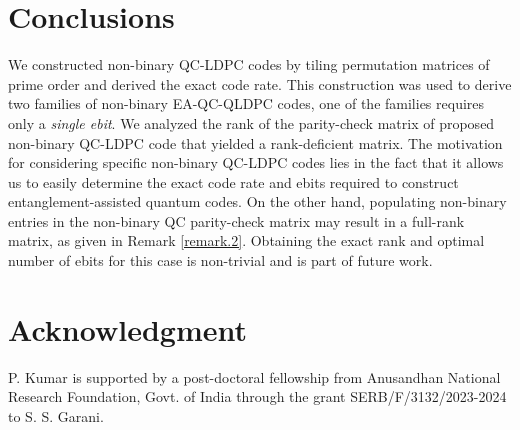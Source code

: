 \documentclass[conference]{IEEEtran}
\begin{document}
\section{Conclusions}\label{Sec.5}
We constructed non-binary QC-LDPC codes by tiling permutation matrices of prime order and  derived the exact code rate. This construction was used to derive two families of non-binary EA-QC-QLDPC codes, one of the families requires only a \textit{single ebit}. We analyzed the rank of the parity-check matrix of proposed non-binary QC-LDPC code that yielded a rank-deficient matrix. The motivation for considering specific non-binary QC-LDPC codes lies in the fact that it allows us to easily determine the exact code rate and ebits required to construct entanglement-assisted quantum codes. On the other hand, populating non-binary entries in the non-binary QC parity-check matrix may result in a full-rank matrix, as given in Remark \ref{remark.2}. Obtaining the exact rank and optimal number of ebits for this case is non-trivial and is part of future work.
\section*{Acknowledgment}
P. Kumar is supported by a post-doctoral fellowship from Anusandhan National Research Foundation, Govt. of India through the grant SERB/F/3132/2023-2024 to S. S. Garani.

\end{document}
